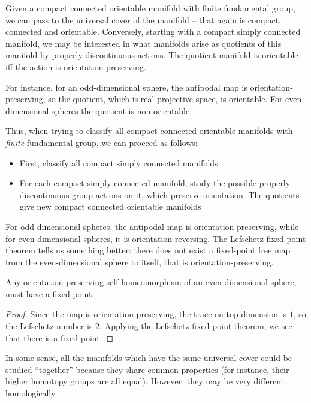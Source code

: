 \documentclass[a4paper]{amsart}
\begin{document}
Given a compact connected orientable manifold with finite fundamental
group, we can pass to the universal cover of the manifold -- that
again is compact, connected and orientable. Conversely, starting with
a compact simply connected manifold, we may be interested in what
manifolds arise as quotients of this manifold by properly
discontinuous actions. The quotient manifold is orientable iff the action
is orientation-preserving.

For instance, for an odd-dimensional sphere, the antipodal map is
orientation-preserving, so the quotient, which is real projective
space, is orientable. For even-dimensional spheres the quotient is
non-orientable.

Thus, when trying to classify all compact connected orientable manifolds
with {\em finite} fundamental group, we can proceed as follows:

\begin{itemize}

\item First, classify all compact simply connected manifolds

\item For each compact simply connected manifold, study the possible
  properly discontinuous group actions on it, which preserve
  orientation. The quotients give new compact connected orientable manifolds

\end{itemize}

For odd-dimensional spheres, the antipodal map is
orientation-preserving, while for even-dimensional spheres, it is
orientation-reversing. The Lefschetz fixed-point theorem tells us
something better: there does not exist a fixed-point free map from the
even-dimensional sphere to itself, that is orientation-preserving.

\begin{theorem}
  Any orientation-preserving self-homeomorphism of an even-dimensional
  sphere, must have a fixed point.
\end{theorem}

\begin{proof}
  Since the map is orientation-preserving, the trace on top dimension
  is $1$, so the Lefschetz number is $2$. Applying the Lefschetz
  fixed-point theorem, we see that there is a fixed point.
\end{proof}

In some sense, all the manifolds which have the same universal cover
could be studied ``together'' because they share common properties
(for instance, their higher homotopy groups are all equal). However,
they may be very different homologically.
\end{document}
